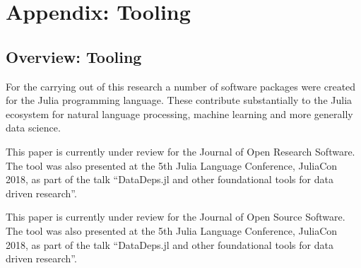 \documentclass{book}
\begin{document}
	\part{Appendix: Tooling}
	
	\chapter{Overview: Tooling}
	For the carrying out of this research a number of software packages were created for the Julia programming language.
	These contribute substantially to the Julia ecosystem for natural language processing, machine learning and more generally data science.
	
	
%	
	
	
	\begin{preamble}
		This paper is currently under review for the Journal of Open Research Software.
		The tool was also presented at the 5th Julia Language Conference, JuliaCon 2018,
		as part of the talk ``DataDeps.jl and other foundational tools for data driven research''.
	\end{preamble}
	
	
		
	\begin{preamble}
		This paper is currently under review for the Journal of Open Source Software.
		The tool was also presented at the 5th Julia Language Conference, JuliaCon 2018,
		as part of the talk ``DataDeps.jl and other foundational tools for data driven research''.
	\end{preamble}
	
\end{document}
